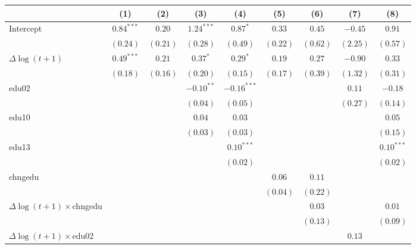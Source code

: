 
\begin{tabular}{l c c c c c c c c }
\hline
 & (1) & (2) & (3) & (4) & (5) & (6) & (7) & (8) \\
\hline
Intercept     & $0.84^{***}$ & $0.20$   & $1.24^{***}$ & $0.87^{*}$    & $0.33$   & $0.45$   & $-0.45$  & $0.91$       \\
                & $(0.24)$     & $(0.21)$ & $(0.28)$     & $(0.49)$      & $(0.22)$ & $(0.62)$ & $(2.25)$ & $(0.57)$     \\
$\Delta \log(t+1)$         & $0.49^{***}$ & $0.21$   & $0.37^{*}$   & $0.29^{*}$    & $0.19$   & $0.27$   & $-0.90$  & $0.33$       \\
                & $(0.18)$     & $(0.16)$ & $(0.20)$     & $(0.15)$      & $(0.17)$ & $(0.39)$ & $(1.32)$ & $(0.31)$     \\
edu02           &              &          & $-0.10^{**}$ & $-0.16^{***}$ &          &          & $0.11$   & $-0.18$      \\
                &              &          & $(0.04)$     & $(0.05)$      &          &          & $(0.27)$ & $(0.14)$     \\
edu10           &              &          & $0.04$       & $0.03$        &          &          &          & $0.05$       \\
                &              &          & $(0.03)$     & $(0.03)$      &          &          &          & $(0.15)$     \\
edu13           &              &          &              & $0.10^{***}$  &          &          &          & $0.10^{***}$ \\
                &              &          &              & $(0.02)$      &          &          &          & $(0.02)$     \\
chngedu         &              &          &              &               & $0.06$   & $0.11$   &          &              \\
                &              &          &              &               & $(0.04)$ & $(0.22)$ &          &              \\
$\Delta \log(t+1) \times$chngedu &              &          &              &               &          & $0.03$   &          & $0.01$       \\
                &              &          &              &               &          & $(0.13)$ &          & $(0.09)$     \\
$\Delta \log(t+1) \times$edu02   &              &          &              &               &          &          & $0.13$   &              \\

\end{tabular}

